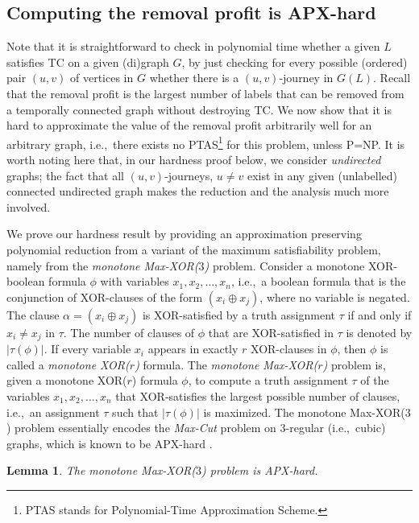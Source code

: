 \documentclass[a4paper,UKenglish]{article}
\newtheorem{lemma}{Lemma}
\begin{document}
\subsection{Computing the removal profit is APX-hard}


Note that it is straightforward to check in polynomial time whether a given $L$ satisfies TC on a given (di)graph $G$, by just checking for every possible
(ordered) pair $(u,v)$ of vertices in $G$ whether there is a $(u,v)$-journey in $G(L)$. Recall that the removal profit is the largest number of labels that can be removed from a temporally connected graph without destroying TC. We now show that it is hard to approximate the value of the removal profit arbitrarily well for an arbitrary
graph, i.e.,~there exists no PTAS\footnote{PTAS stands for Polynomial-Time Approximation Scheme.} for this problem, unless P=NP. It is worth noting here that, in our hardness proof below, we consider \emph{undirected} graphs; the fact that all $(u,v)$-journeys, $u\not=v$ exist in any given (unlabelled) connected undirected graph makes the reduction and the analysis much more involved.

We prove our hardness result by providing an approximation preserving
polynomial reduction from a variant of the maximum satisfiability problem,
namely from the \emph{monotone Max-XOR($3$)} problem. Consider a monotone
XOR-boolean formula $\phi $ with variables $x_{1},x_{2},\ldots ,x_{n}$,
i.e.,~a boolean formula that is the conjunction of XOR-clauses of the form $(x_{i}\oplus x_{j})$, where no variable is negated. The clause $\alpha
=(x_{i}\oplus x_{j})$ is XOR-satisfied by a truth assignment $\tau $ if and
only if $x_{i}\neq x_{j}$ in $\tau $. The number of clauses of $\phi $ that
are XOR-satisfied in $\tau $ is denoted by $|\tau (\phi )|$. If every
variable $x_{i}$ appears in exactly $r$ XOR-clauses in $\phi $, then $\phi $
is called a \emph{monotone XOR(}$r$\emph{)} formula. The \emph{monotone
Max-XOR(}$r$\emph{)} problem is, given a monotone XOR($r$) formula $\phi $,
to compute a truth assignment $\tau $ of the variables $x_{1},x_{2},\ldots
,x_{n}$ that XOR-satisfies the largest possible number of clauses, i.e.,~an
assignment $\tau $ such that $|\tau (\phi )|$ is maximized. The monotone
Max-XOR($3$) problem essentially encodes the \emph{Max-Cut} problem on $3$-regular (i.e.,~cubic) graphs, which is known to be APX-hard \cite{Alimonti}.

\begin{lemma}\hspace{-0,01cm}\protect\cite{Alimonti}
\label{Max_XOR-3-hard-lem}The monotone Max-XOR($3$) problem is APX-hard.
\end{lemma}
\end{document}

